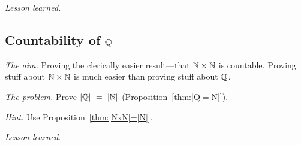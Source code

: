 \noindent \textit{Lesson learned.}




\subsection{Countability of $\mathbb{Q}$}

\noindent \textit{The aim.}
Proving  the clerically easier result---that $\mathbb{N} \times \mathbb{N}$ is countable. 
Proving stuff about $\mathbb{N} \times \mathbb{N}$ is much easier than proving stuff about $\mathbb{Q}$.
\medskip

\noindent \textit{The problem.}
Prove $|\Q| \ = \ |\N|$ (Proposition~\ref{thm:|Q|=|N|}).
\medskip

\noindent \textit{Hint.}
Use Proposition~\ref{thm:|NxN|=|N|}.
\medskip

\noindent \textit{Lesson learned.}




